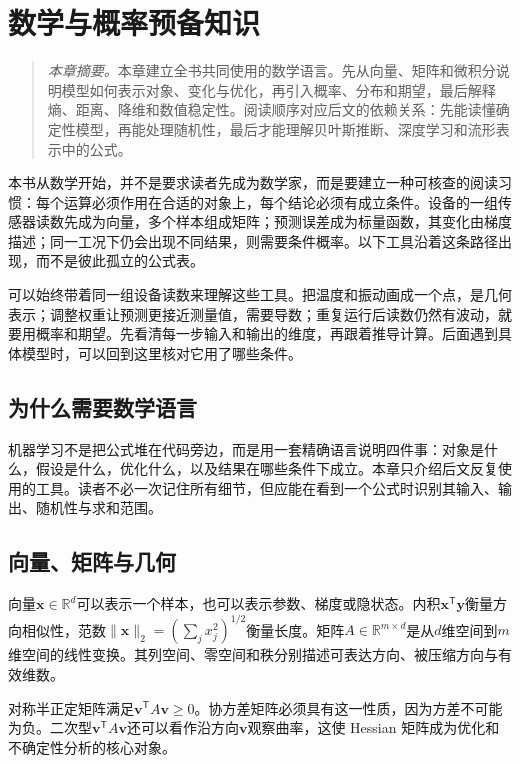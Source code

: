 \chapter{数学与概率预备知识}

\begin{quote}\small
\textit{本章摘要。}本章建立全书共同使用的数学语言。先从向量、矩阵和微积分说明模型如何表示对象、变化与优化，再引入概率、分布和期望，最后解释熵、距离、降维和数值稳定性。阅读顺序对应后文的依赖关系：先能读懂确定性模型，再能处理随机性，最后才能理解贝叶斯推断、深度学习和流形表示中的公式。
\end{quote}

本书从数学开始，并不是要求读者先成为数学家，而是要建立一种可核查的阅读习惯：每个运算必须作用在合适的对象上，每个结论必须有成立条件。设备的一组传感器读数先成为向量，多个样本组成矩阵；预测误差成为标量函数，其变化由梯度描述；同一工况下仍会出现不同结果，则需要条件概率。以下工具沿着这条路径出现，而不是彼此孤立的公式表。

可以始终带着同一组设备读数来理解这些工具。把温度和振动画成一个点，是几何表示；调整权重让预测更接近测量值，需要导数；重复运行后读数仍然有波动，就要用概率和期望。先看清每一步输入和输出的维度，再跟着推导计算。后面遇到具体模型时，可以回到这里核对它用了哪些条件。

\section{为什么需要数学语言}
机器学习不是把公式堆在代码旁边，而是用一套精确语言说明四件事：对象是什么，假设是什么，优化什么，以及结果在哪些条件下成立。本章只介绍后文反复使用的工具。读者不必一次记住所有细节，但应能在看到一个公式时识别其输入、输出、随机性与求和范围。

\section{向量、矩阵与几何}
向量$\bm{x}\in\mathbb{R}^d$可以表示一个样本，也可以表示参数、梯度或隐状态。内积$\bm{x}^{\mathsf T}\bm{y}$衡量方向相似性，范数$\|\bm{x}\|_2=(\sum_jx_j^2)^{1/2}$衡量长度。矩阵$A\in\mathbb{R}^{m\times d}$是从$d$维空间到$m$维空间的线性变换。其列空间、零空间和秩分别描述可表达方向、被压缩方向与有效维数。

对称半正定矩阵满足$\bm{v}^{\mathsf T}A\bm{v}\geq0$。协方差矩阵必须具有这一性质，因为方差不可能为负。二次型$\bm{v}^{\mathsf T}A\bm{v}$还可以看作沿方向$\bm{v}$观察曲率，这使 Hessian 矩阵成为优化和不确定性分析的核心对象。


